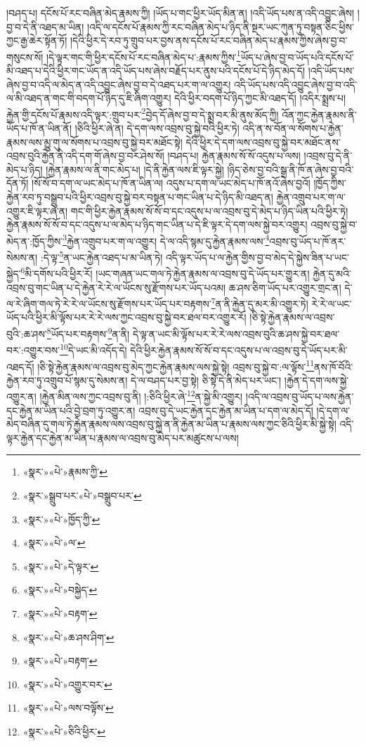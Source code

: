 །བཤད་པ། དངོས་པོ་རང་བཞིན་མེད་རྣམས་ཀྱི། །ཡོད་པ་གང་ཕྱིར་ཡོད་མིན་ན། །འདི་ཡོད་པས་ན་འདི་འབྱུང་ཞེས། །བྱ་བ་དེ་ནི་འཐད་མ་ཡིན། །འདི་ལ་དངོས་པོ་རྣམས་ཀྱི་རང་བཞིན་མེད་པ་ཉིད་ནི་སྔར་ཡང་ཀུན་ཏུ་བསྟན་ཅིང་ཕྱིས་ཀྱང་རྒྱ་ཆེར་སྟོན་ཏོ། །དེའི་ཕྱིར་དེ་རབ་ཏུ་གྲུབ་པར་བྱས་ནས་དངོས་པོ་རང་བཞིན་མེད་པ་རྣམས་ཀྱིས་ཞེས་བྱ་བ་གསུངས་སོ། །དེ་ལྟར་གང་གི་ཕྱིར་དངོས་པོ་རང་བཞིན་མེད་པ་:རྣམས་ཀྱིས་\footnote{«སྣར་»«པེ་»རྣམས་ཀྱི་}ཡོད་པ་ཞེས་བྱ་བ་ཡོད་པའི་དངོས་པོ་མི་འཐད་པ་དེའི་ཕྱིར་གང་ཡོད་ན་འདི་ཡོད་པས་ཞེས་བརྗོད་པར་ནུས་པའི་དངོས་པོ་དེ་ཉིད་མེད་དོ། །འདི་ཡོད་པས་ཞེས་བྱ་བ་འདི་ལ་མེད་ན་འདི་འབྱུང་ཞེས་བྱ་བ་དེ་འཐད་པར་ག་ལ་འགྱུར། འདི་ཡོད་པས་འདི་འབྱུང་ཞེས་བྱ་བ་འདི་ལ་མི་འཐད་ན་གང་གི་བདག་པོ་ཉིད་དུ་ཇི་ཞིག་འགྱུར། དེའི་ཕྱིར་བདག་པོ་ཉིད་ཀྱང་མི་འཐད་དོ། །འདིར་སྨྲས་པ། རྐྱེན་གྱི་དངོས་པོ་རྣམས་འདི་ལྟར་:གྲུབ་པར་\footnote{«སྣར་»སྒྲུབ་པར་«པེ་»བསྒྲུབ་པར་}བྱེད་དོ་ཞེས་བྱ་བ་དེ་སྨྲ་བར་མི་ནུས་མོད་ཀྱི། འོན་ཀྱང་རྐྱེན་རྣམས་ནི་ཡོད་པ་ཁོ་ན་ཡིན་ནོ། །ཅིའི་ཕྱིར་ཞེ་ན། དེ་དག་ལས་འབྲས་བུ་སྐྱེ་བའི་ཕྱིར་ཏེ། འདི་ན་ས་བོན་ལ་སོགས་པ་རྐྱེན་རྣམས་ལས་མྱུ་གུ་ལ་སོགས་པ་འབྲས་བུ་སྐྱེ་བར་མཐོང་སྟེ། དེའི་ཕྱིར་དེ་དག་ལས་འབྲས་བུ་སྐྱེ་བར་མཐོང་ནས་འབྲས་བུའི་རྐྱེན་ནི་འདི་དག་གོ་ཞེས་བྱ་བར་ཤེས་སོ། །བཤད་པ། རྐྱེན་རྣམས་སོ་སོ་འདུས་པ་ལས། །འབྲས་བུ་དེ་ནི་མེད་པ་ཉིད། །རྐྱེན་རྣམས་ལ་ནི་གང་མེད་པ། །དེ་ནི་རྐྱེན་ལས་ཇི་ལྟར་སྐྱེ། །ཉིད་ཅེས་བྱ་བའི་སྒྲ་ནི་ཁོ་ན་ཞེས་བྱ་བའི་དོན་ཏོ། །སོ་སོ་བ་དག་ལ་ཡང་མེད་པ་ཁོ་ན་ཡིན་ལ། འདུས་པ་དག་ལ་ཡང་མེད་པ་ཁོ་ནའོ་ཞེས་བྱའོ། །ཁྱོད་ཀྱིས་རྐྱེན་རབ་ཏུ་བསྒྲུབ་པའི་ཕྱིར་འབྲས་བུ་སྐྱེ་བར་བསྟན་པ་གང་ཡིན་པ་དེ་ཉིད་མི་འཐད་ན། རྐྱེན་འགྲུབ་པར་ག་ལ་འགྱུར་ཇི་ལྟར་ཞེ་ན། གང་གི་ཕྱིར་རྐྱེན་རྣམས་སོ་སོ་བ་དང་འདུས་པ་ལ་འབྲས་བུ་དེ་མེད་པ་ཉིད་ཡིན་པའི་ཕྱིར་ཏེ། རྐྱེན་རྣམས་སོ་སོ་བ་དང་འདུས་པ་ལ་མེད་པ་ཉིད་གང་ཡིན་པ་དེ་ཇི་ལྟར་དེ་དག་ལས་སྐྱེ་བར་འགྱུར། འབྲས་བུ་སྐྱེ་བ་མེད་ན་:ཁྱོད་ཀྱིས་\footnote{«སྣར་»«པེ་»ཁྱོད་ཀྱི་}རྐྱེན་འགྲུབ་པར་ག་ལ་འགྱུར། དེ་ལ་འདི་སྙམ་དུ་རྐྱེན་རྣམས་ལས་\footnote{«སྣར་»«པེ་»ལ་}འབྲས་བུ་ཡོད་པ་ཁོ་ནར་སེམས་ན། :དེ་ལྟ་\footnote{«སྣར་»«པེ་»དེ་ལྟར་}ན་ཡང་རྐྱེན་འཐད་པ་མ་ཡིན་ཏེ། འདི་ལྟར་ཡོད་པ་ལ་རྐྱེན་གྱིས་བྱ་བ་མེད་དེ་སྐྱེས་ཟིན་པ་ཡང་སྐྱེད་\footnote{«སྣར་»«པེ་»བསྐྱེད་}མི་དགོས་པའི་ཕྱིར་རོ། །ཡང་གཞན་ཡང་གལ་ཏེ་རྐྱེན་རྣམས་ལ་འབྲས་བུ་དེ་ཡོད་པར་གྱུར་ན། རྐྱེན་དུ་མའི་འབྲས་བུ་གང་ཡིན་པ་དེ་རྐྱེན་རེ་རེ་ལ་ཡོངས་སུ་རྫོགས་པར་ཡོད་པའམ། ཆ་ཤས་ཅིག་ཡོད་པར་འགྱུར་གྲང་ན། དེ་ལ་རེ་ཞིག་གལ་ཏེ་རེ་རེ་ལ་ཡོངས་སུ་རྫོགས་པར་ཡོད་པར་བརྟགས་\footnote{«སྣར་»«པེ་»བརྟག་}ན་ནི་རྐྱེན་དུ་མར་མི་འགྱུར་ཏེ། རེ་རེ་ལ་ཡང་ཡོད་པའི་ཕྱིར་མི་ལྟོས་པར་རེ་རེ་ལས་ཀྱང་འབྲས་བུ་སྐྱེ་བར་ཐལ་བར་འགྱུར་རོ། །ཅི་སྟེ་རྐྱེན་རྣམས་ལ་འབྲས་བུའི་:ཆ་ཤས་\footnote{«སྣར་»«པེ་»ཆ་ཤས་ཤིག་}ཡོད་པར་བརྟགས་\footnote{«སྣར་»«པེ་»བརྟག་}ན་ནི། དེ་ལྟ་ན་ཡང་མི་ལྟོས་པར་རེ་རེ་ལས་འབྲས་བུའི་ཆ་ཤས་སྐྱེ་བར་ཐལ་བར་:འགྱུར་བས་\footnote{«སྣར་»«པེ་»འགྱུར་བར་}དེ་ཡང་མི་འདོད་དེ། དེའི་ཕྱིར་རྐྱེན་རྣམས་སོ་སོ་བ་དང་འདུས་པ་ལ་འབྲས་བུ་དེ་ཡོད་པར་མི་འཐད་དོ། །ཅི་སྟེ་རྐྱེན་རྣམས་ལ་འབྲས་བུ་མེད་ཀྱང་རྐྱེན་རྣམས་ལས་སྐྱེ་སྟེ། འབྲས་བུ་སྐྱེ་བ་:ལ་ལྟོས་\footnote{«སྣར་»«པེ་»ལས་བལྟོས་}ནས་ཁོ་བོའི་རྐྱེན་རབ་ཏུ་འགྲུབ་པོ་སྙམ་དུ་སེམས་ན། དེ་ལ་བཤད་པར་བྱ་སྟེ། ཅི་སྟེ་དེ་ནི་མེད་པར་ཡང་། །རྐྱེན་དེ་དག་ལས་སྐྱེ་འགྱུར་ན། །རྐྱེན་མིན་ལས་ཀྱང་འབྲས་བུ་ནི། །:ཅིའི་ཕྱིར་ཞེ་\footnote{«སྣར་»«པེ་»ཅིའི་ཕྱིར་}ན་སྐྱེ་མི་འགྱུར། །འདི་ལ་འབྲས་བུ་ཡོད་པ་ལས་རྐྱེན་དང་རྐྱེན་མ་ཡིན་པའི་བྱེ་བྲག་ཏུ་འགྱུར་ན། འབྲས་བུ་དེ་ཡང་རྐྱེན་དང་རྐྱེན་མ་ཡིན་པ་དག་ལ་མེད་དོ། །དེ་དག་ལ་མེད་བཞིན་དུ་གལ་ཏེ་རྐྱེན་རྣམས་ལས་འབྲས་བུ་སྐྱེ་ན་ནི་རྐྱེན་མ་ཡིན་པ་རྣམས་ལས་ཀྱང་ཅིའི་ཕྱིར་མི་སྐྱེ་སྟེ། འདི་ལྟར་རྐྱེན་དང་རྐྱེན་མ་ཡིན་པ་རྣམས་ལ་འབྲས་བུ་མེད་པར་མཚུངས་པ་ལས། 